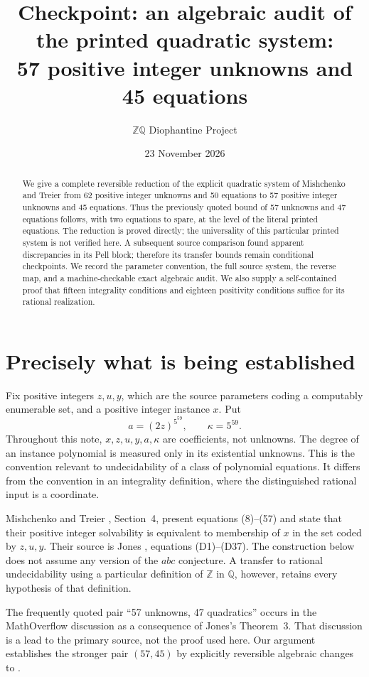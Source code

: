 \documentclass[11pt]{article}
\title{Checkpoint: an algebraic audit of the printed quadratic system:\\57 positive integer unknowns and 45 equations}
\author{\(\mathbb Z\mathbb Q\) Diophantine Project}
\date{23 November 2026}
\newcommand{\Z}{\mathbb Z}
\newcommand{\Q}{\mathbb Q}
\begin{document}
\maketitle
\begin{abstract}
We give a complete reversible reduction of the explicit quadratic system of
Mishchenko and Treier from 62 positive integer unknowns and 50 equations to
57 positive integer unknowns and 45 equations. Thus the previously quoted
bound of 57 unknowns and 47 equations follows, with two equations to spare, at the level of the literal printed equations.
The reduction is proved directly; the universality of this particular printed system is not verified here.
A subsequent source comparison found apparent discrepancies in its Pell block;
therefore its transfer bounds remain conditional checkpoints. We record the parameter convention, the full source system,
the reverse map, and a machine-checkable exact algebraic audit. We also
supply a self-contained proof that fifteen integrality conditions and eighteen
positivity conditions suffice for its rational realization.
\end{abstract}

\section{Precisely what is being established}
Fix positive integers \(z,u,y\), which are the source parameters coding a
computably enumerable set, and a positive integer instance \(x\). Put
\[
 a=(2z)^{5^{59}},\qquad \kappa=5^{59}.
\]
Throughout this note, \(x,z,u,y,a,\kappa\) are coefficients, not unknowns.
The degree of an instance polynomial is measured only in its existential
unknowns. This is the convention relevant to undecidability of a class of
polynomial equations. It differs from the convention in an integrality
definition, where the distinguished rational input is a coordinate.

Mishchenko and Treier \cite{MT}, Section~4, present equations (8)--(57) and
state that their positive integer solvability is equivalent to membership
of \(x\) in the set coded by \(z,u,y\). Their source is Jones
\cite{Jones}, equations (D1)--(D37). The construction below does not assume
any version of the \(abc\) conjecture. A transfer to rational undecidability
using a particular definition of \(\Z\) in \(\Q\), however, retains every
hypothesis of that definition.

The frequently quoted pair ``57 unknowns, 47 quadratics'' occurs in the
MathOverflow discussion \cite{MO} as a consequence of Jones's Theorem~3.
That discussion is a lead to the primary source, not the proof used here.
Our argument establishes the stronger pair \((57,45)\) by explicitly
reversible algebraic changes to \cite{MT}.
\end{document}
